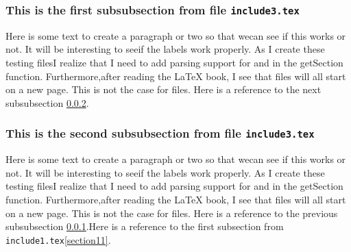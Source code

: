 \subsubsection{This is the first subsubsection from file \texttt{include3.tex}}\label{section31}Here is some text to create a paragraph or two so that wecan see if this works or not.  It will be interesting to seeif the labels work properly.  As I create these testing filesI realize that I need to add parsing support for \verb##and \verb## in the getSection function.   Furthermore,after reading the \LaTeX{} book, I see that \verb## files will all start on a new page.  This is not the case for\verb## files.  Here is a reference to the next subsubsection \ref{section32}.\subsubsection{This is the second subsubsection from file \texttt{include3.tex}}\label{section32}Here is some text to create a paragraph or two so that wecan see if this works or not.  It will be interesting to seeif the labels work properly.  As I create these testing filesI realize that I need to add parsing support for \verb##and \verb## in the getSection function.   Furthermore,after reading the \LaTeX{} book, I see that \verb## files will all start on a new page.  This is not the case for\verb## files.  Here is a reference to the previous subsubsection \ref{section31}.Here is a reference to the first subsection from \texttt{include1.tex}\ref{section11}.